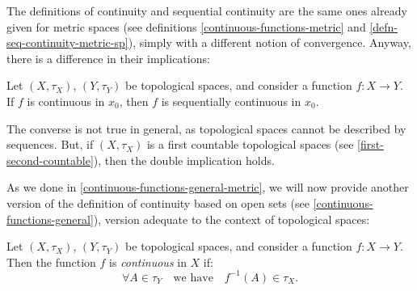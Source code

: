 The definitions of continuity and sequential continuity are the same ones already given for metric spaces (see definitions \vref{continuous-functions-metric} and \vref{defn-seq-continuity-metric-sp}), simply with a different notion of convergence. Anyway, there is a difference in their implications:

\begin{prop}
	Let $(X, \tau_X)$, $(Y, \tau_Y)$ be topological spaces, and consider a function $f: X \to Y$.\\
	If $f$ is continuous in $x_0$, then $f$ is sequentially continuous in $x_0$.
\end{prop}
The converse is not true in general, as topological spaces cannot be described by sequences. But, if $(X, \tau_X)$ is a first countable topological spaces (see \vref{first-second-countable}), then the double implication holds.

As we done in \vref{continuous-functions-general-metric}, we will now provide another version of the definition of continuity based on open sets (see \vref{continuous-functions-general}), version adequate to the context of topological spaces:

\begin{theo}\label{continuous-functions-general-topological}
	Let $(X, \tau_X)$, $(Y, \tau_Y)$ be topological spaces, and consider a function $f: X \to Y$.\\
	Then the function $f$ is \emph{continuous} in $X$ if:
	$$
		\forall A \in \tau_Y 
		\quad \text{we have} 
		\quad f^{-1}(A) \in \tau_X
	.
	$$
\end{theo} 

